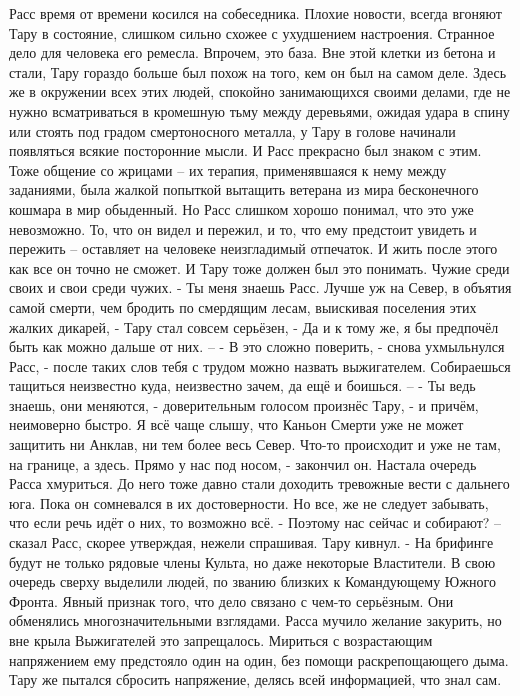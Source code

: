 \documentclass[a4paper, 12pt]{report}
\begin{document}
Расс время от времени косился на собеседника. Плохие новости, всегда вгоняют Тару в состояние, слишком сильно схожее с ухудшением настроения. Странное дело для человека его ремесла. Впрочем, это база. Вне этой клетки из бетона и стали, Тару гораздо больше был похож на того, кем он был на самом деле. Здесь же в окружении всех этих людей, спокойно занимающихся своими делами, где не нужно всматриваться в кромешную тьму между деревьями, ожидая удара в спину или стоять под градом смертоносного металла, у Тару в голове начинали появляться всякие посторонние мысли. И Расс прекрасно был знаком с этим. Тоже общение со жрицами – их терапия, применявшаяся к нему между заданиями, была жалкой попыткой вытащить ветерана из мира бесконечного кошмара в мир обыденный. Но Расс слишком хорошо понимал, что это уже невозможно. То, что он видел и пережил, и то, что ему предстоит увидеть и пережить – оставляет на человеке неизгладимый отпечаток. И жить после этого как все он точно не сможет. И Тару тоже должен был это понимать.
	Чужие среди своих и свои среди чужих.
 	- Ты меня знаешь Расс. Лучше уж на Север, в объятия самой смерти, чем бродить по смердящим лесам, выискивая поселения этих жалких дикарей, - Тару стал совсем серьёзен, - Да и к тому же, я бы предпочёл быть как можно дальше от них. –
	- В это сложно поверить, - снова ухмыльнулся Расс, - после таких слов тебя с трудом можно назвать выжигателем. Собираешься тащиться неизвестно куда, неизвестно зачем, да ещё и боишься. –
	- Ты ведь знаешь, они меняются, - доверительным голосом произнёс Тару, - и причём, неимоверно быстро. Я всё чаще слышу, что Каньон Смерти уже не может защитить ни Анклав, ни тем более весь Север. Что-то происходит и уже не там, на границе, а здесь. Прямо у нас под носом, - закончил он.
	Настала очередь Расса хмуриться. До него тоже давно стали доходить тревожные вести с дальнего юга. Пока он сомневался в их достоверности. Но все, же не следует забывать, что если речь идёт о них, то возможно всё.   
	- Поэтому нас сейчас и собирают? – сказал Расс, скорее утверждая, нежели спрашивая.
	Тару кивнул.
	- На брифинге будут не только рядовые члены Культа, но даже некоторые Властители. В свою очередь сверху выделили людей, по званию близких к Командующему Южного Фронта. Явный признак того, что дело связано с чем-то серьёзным.
	Они обменялись многозначительными взглядами. Расса мучило желание закурить, но вне крыла Выжигателей это запрещалось. Мириться с возрастающим напряжением ему предстояло один на один, без помощи раскрепощающего дыма. Тару же пытался сбросить напряжение, делясь всей информацией, что знал сам.
\end{document}
